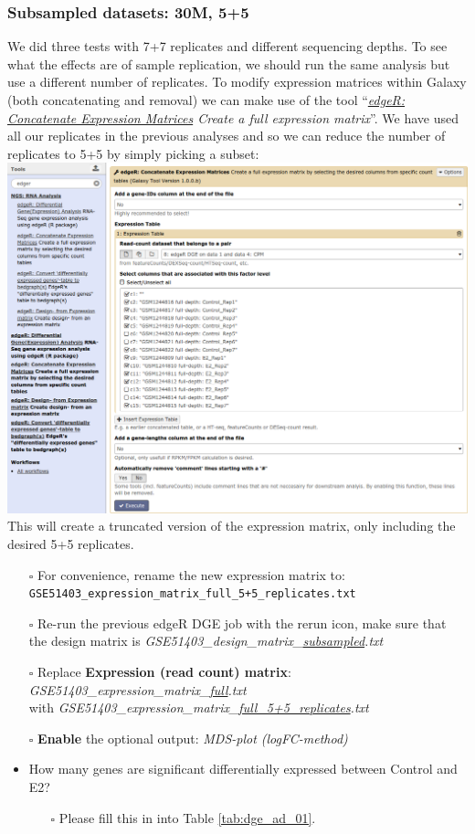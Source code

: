 \subsubsection{Subsampled datasets: 30M, 5+5}
We did three tests with 7+7 replicates and different sequencing depths.
To see what the effects are of sample replication, we should run the same analysis but use a different number of replicates.
To modify expression matrices within Galaxy (both concatenating and removal) we can make use of the tool ``\textit{\underline{edgeR: Concatenate Expression Matrices} Create a full expression matrix}''. We have used all our replicates in the previous analyses and so we can reduce the number of replicates to 5+5 by simply picking a subset:\\
\includegraphics[width=\textwidth]{figures/expression_03.png}\\
This will create a truncated version of the expression matrix, only including the desired 5+5 replicates.
\begin{itemize}
	\item [$\square$] For convenience, rename the new expression matrix to:\\ \verb|GSE51403_expression_matrix_full_5+5_replicates.txt|
	\item [$\square$] Re-run the previous edgeR DGE job with the rerun icon, make sure that the design matrix is \textit{GSE51403\_design\_matrix\_\underline{subsampled}.txt}
	\item [$\square$] Replace \textbf{Expression (read count) matrix}: \textit{GSE51403\_expression\_matrix\_\underline{full}.txt}\\ with \textit{GSE51403\_expression\_matrix\_\underline{full\_5+5\_replicates}.txt}
	\item [$\square$] \textbf{Enable} the optional output: \textit{MDS-plot (logFC-method)}
	\item How many genes are significant differentially expressed between Control and E2?
	\begin{itemize}
		\item[$\square$] Please fill this in into Table \ref{tab:dge_ad_01}.
	\end{itemize}
\end{itemize}
